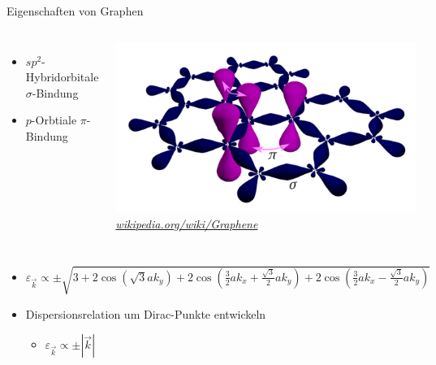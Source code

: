 \documentclass[aspectratio=1610, 9pt, xcolor=dvipsnames]{beamer}
\begin{document}
\begin{frame}{Eigenschaften von Graphen}
\begin{columns}
  \begin{itemize}
      \item $sp^2$-Hybridorbitale {\color{tugreen} \textrightarrow} $\sigma$-Bindung 
      \item $p$-Orbtiale {\color{tugreen} \textrightarrow} $\pi$-Bindung
      \end{itemize}
  \centering
    \includegraphics[width=\textwidth]{Plots/orbitals.png}
    \hspace*{12pt}\hbox{\scriptsize {\footnotesize\itshape \href{https://en.wikipedia.org/wiki/Graphene}{wikipedia.org/wiki/Graphene}}}
  \end{columns}
  \begin{columns}
  \pause 
  \begin{itemize}
    \vspace*{-2cm}
      \item 
      $\varepsilon_{\vec{k}} \propto \pm \sqrt{3+2 \cos \left ( \sqrt{3}ak_y \right )+2\cos \left ( \frac{3}{2}ak_x+\frac{\sqrt{3}}{2}ak_y \right ) + 2\cos \left ( \frac{3}{2}ak_x-\frac{\sqrt{3}}{2}ak_y \right ) }$
    \item Dispersionsrelation um Dirac-Punkte entwickeln
      \begin{itemize}
        \item[\textrightarrow] $\varepsilon_{\vec{k}} \propto \pm | \vec{k} |$
      \end{itemize}
    \end{itemize} 
    \vspace*{0.3cm}
    \centering
      \includegraphics[width=\textwidth]{Plots/dirac_cones.png}

\end{columns}
\end{frame}
\end{document}
